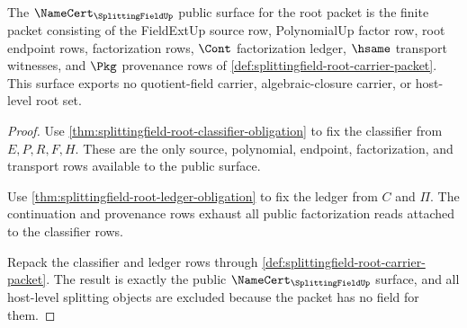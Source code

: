 \begin{theorem}
\label{thm:splittingfield-root-namecert-surface}
The $\NameCert_{\SplittingFieldUp}$ public surface for the root packet is the
finite packet consisting of the FieldExtUp source row, PolynomialUp factor
row, root endpoint rows, factorization rows, $\Cont$ factorization ledger,
$\hsame$ transport witnesses, and $\Pkg$ provenance rows of
\autoref{def:splittingfield-root-carrier-packet}. This surface exports no
quotient-field carrier, algebraic-closure carrier, or host-level root set.
\end{theorem}
\begin{proof}
Use \autoref{thm:splittingfield-root-classifier-obligation} to fix the
classifier from $E,P,R,F,H$. These are the only source, polynomial,
endpoint, factorization, and transport rows available to the public surface.

Use \autoref{thm:splittingfield-root-ledger-obligation} to fix the ledger
from $C$ and $\Pi$. The continuation and provenance rows exhaust all public
factorization reads attached to the classifier rows.

Repack the classifier and ledger rows through
\autoref{def:splittingfield-root-carrier-packet}. The result is exactly the
public $\NameCert_{\SplittingFieldUp}$ surface, and all host-level splitting
objects are excluded because the packet has no field for them.
\end{proof}

